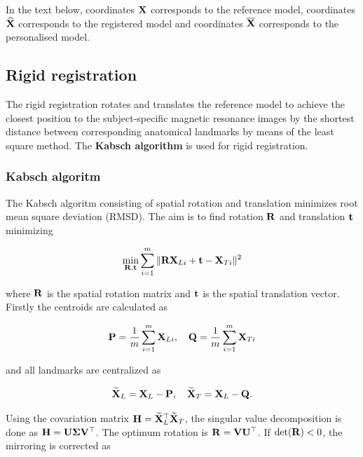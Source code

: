 In the text below, coordinates ${\bf X}$ corresponds to the reference model, coordinates $\widehat{\bf X}$ corresponds to the registered model and coordinates $\overline{\bf X}$ corresponds to the personalised model.

\subsection*{Rigid registration}
The rigid registration rotates and translates the reference model to achieve the closest position to the subject-specific magnetic resonance images by the shortest distance between corresponding anatomical landmarks by means of the least square method. The {\bf Kabsch algorithm} is used for rigid registration.

\subsubsection*{Kabsch algoritm}
The Kabsch algoritm consisting of spatial rotation and translation minimizes root mean square deviation (RMSD). The aim is to find rotation $\bf R$ and translation $\bf t$ minimizing

\begin{equation}
\min_{{\bf R}, {\bf t}} \sum_{i=1}^{m} \| {\bf R}{\bf X}_{Li}+{\bf t}-{\bf X}_{Ti}\|^2
\end{equation}

where $\bf R$ is the spatial rotation matrix and $\bf t$ is the spatial translation vector. Firstly the centroids are calculated as 

\begin{equation}
{\bf P} = \frac{1}{m} \sum_{i=1}^m{\bf X}_{Li}, \quad
{\bf Q} = \frac{1}{m} \sum_{i=1}^m{\bf X}_{Ti}
\end{equation}

and all landmarks are centralized as

\begin{equation}
\widetilde{\bf X}_{L}={\bf X}_{L} - {\bf P}, \quad \widetilde{\bf X}_{T} = {\bf X}_{L}-{\bf Q}\mbox{.}
\end{equation}

Using the covariation matrix ${\bf H}=\widetilde{\bf X}_{L}^\top\widetilde{\bf X}_{T}$, the singular value decomposition is done as ${\bf H}={\bf U}{\bf\Sigma}{\bf V}^\top$. The optimum rotation is ${\bf R}={\bf V}{\bf U}^\top$. If $\det({\bf R})<0$, the mirroring is corrected as

